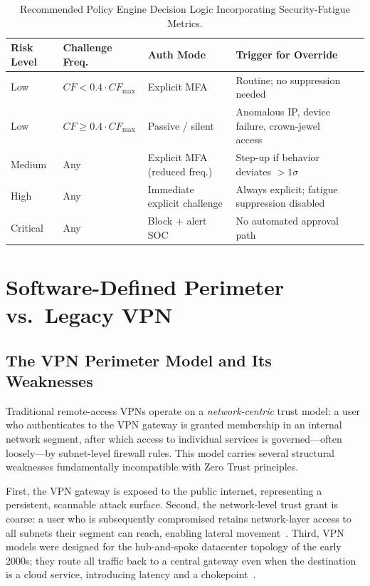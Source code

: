 \documentclass[sigconf,nonacm]{acmart}
\begin{document}
\begin{table}[htbp]
\centering
\caption{Recommended Policy Engine Decision Logic Incorporating Security-Fatigue Metrics.}
\label{tab:fatigue_logic}
\small
\setlength{\tabcolsep}{5pt}
\begin{tabularx}{\textwidth}{@{}llll X@{}}
\toprule
\textbf{Risk Level} & \textbf{Challenge Freq.} & \textbf{Auth Mode} &
\textbf{Trigger for Override} \\
\midrule
Low    & $CF < 0.4 \cdot CF_{\max}$  & Explicit MFA              & Routine; no suppression needed \\
Low    & $CF \geq 0.4 \cdot CF_{\max}$ & Passive / silent        & Anomalous IP, device failure, crown-jewel access \\
Medium & Any                          & Explicit MFA (reduced freq.) & Step-up if behavior deviates $> 1\sigma$ \\
High   & Any                          & Immediate explicit challenge & Always explicit; fatigue suppression disabled \\
Critical & Any                        & Block + alert SOC         & No automated approval path \\
\bottomrule
\end{tabularx}
\end{table}

\section{Software-Defined Perimeter vs.\ Legacy VPN}
\label{sec:sdp}

\subsection{The VPN Perimeter Model and Its Weaknesses}

Traditional remote-access VPNs operate on a \emph{network-centric} trust model:
a user who authenticates to the VPN gateway is granted membership in an internal
network segment, after which access to individual services is governed---often
loosely---by subnet-level firewall rules. This model carries several structural
weaknesses fundamentally incompatible with Zero Trust principles.

First, the VPN gateway is exposed to the public internet, representing a
persistent, scannable attack surface. Second, the network-level trust grant is
coarse: a user who is subsequently compromised retains network-layer access to
all subnets their segment can reach, enabling lateral
movement~\cite{patel_sdp_zt2024}. Third, VPN models were designed for the
hub-and-spoke datacenter topology of the early 2000s; they route all traffic
back to a central gateway even when the destination is a cloud service,
introducing latency and a chokepoint~\cite{csa_sdp2023}.
\end{document}
